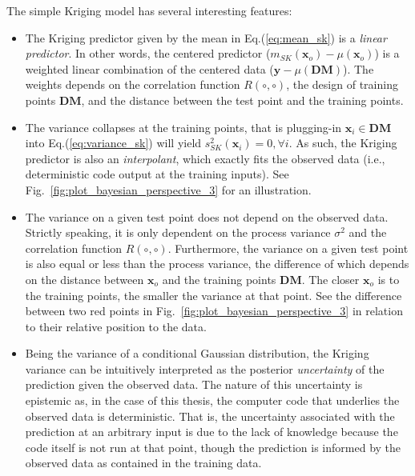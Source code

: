 The simple Kriging model has several interesting features:
\begin{itemize}

	\item The Kriging predictor given by the mean in Eq.(\ref{eq:mean_sk}) is a \emph{linear predictor}. 
	      In other words, the centered predictor ($m_{SK}(\bm{x}_o) - \mu (\bm{x}_o)$)  is a weighted linear combination of the centered data 
	      ($\mathbf{y} - \mu(\mathbf{DM})$).
				The weights depends on the correlation function $R(\circ,\circ)$, the design of training points $\mathbf{DM}$, and the distance between the test point and the training points.

	\item The variance collapses at the training points, that is plugging-in $\mathbf{x}_i \in \mathbf{DM}$ into Eq.(\ref{eq:variance_sk}) will yield $s^2_{SK}(\mathbf{x}_i) = 0, \forall i$.
	      As such, the Kriging predictor is also an \emph{interpolant}, which exactly fits the observed data (i.e., deterministic code output at the training inputs).
				See Fig.~\ref{fig:plot_bayesian_perspective_3} for an illustration.

	\item The variance on a given test point does not depend on the observed data.
	      Strictly speaking, it is only dependent on the process variance $\sigma^2$ and the correlation function $R(\circ,\circ)$.
				Furthermore, the variance on a given test point is also equal or less than the process variance, 
				the difference of which depends on the distance between $\bm{x}_o$ and the training points $\mathbf{DM}$.
				The closer $\bm{x}_o$ is to the training points, the smaller the variance at that point.
				See the difference between two red points in Fig.~\ref{fig:plot_bayesian_perspective_3} in relation to their relative position to the data.

	\item Being the variance of a conditional Gaussian distribution, the Kriging variance can be intuitively interpreted as the posterior \emph{uncertainty} of the prediction given the observed data.
	      The nature of this uncertainty is epistemic as, in the case of this thesis, the computer code that underlies the observed data is deterministic.
				That is, the uncertainty associated with the prediction at an arbitrary input is due to the lack of knowledge because the code itself is not run at that point,
				though the prediction is informed by the observed data as contained in the training data.
\end{itemize}

